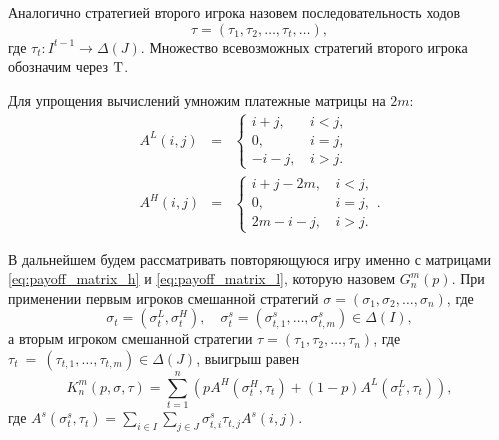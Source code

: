 Аналогично стратегией второго игрока назовем последовательность ходов
\[
  \tau = (\tau_1, \tau_2, \ldots, \tau_t, \ldots),
\]
где $ \tau_t: I^{t-1} \rightarrow \Delta(J) $. Множество всевозможных стратегий второго игрока обозначим через $ \mathrm{T} $.

Для упрощения вычислений умножим платежные матрицы на $ 2m $:
\begin{eqnarray}
\label{eq:payoff_matrix_h}
A^L(i, j) &=& \begin{cases}
  i + j, &\, i < j, \\
  0, &\, i = j, \\
  -i - j, &\, i > j.
\end{cases}
\\
\label{eq:payoff_matrix_l}
A^H(i, j) &=& \begin{cases}
  i + j - 2m, &\, i < j, \\
  0, &\, i = j, \\
  2m - i - j, &\, i > j.
\end{cases}.
\end{eqnarray}

В дальнейшем будем рассматривать повторяющуюся игру именно с матрицами \eqref{eq:payoff_matrix_h} и \eqref{eq:payoff_matrix_l}, которую назовем $ G_n^m(p) $. При применении первым игроков смешанной стратегий 
$ \sigma = (\sigma_1, \sigma_2, \ldots, \sigma_n) $, где 
\[ 
  \sigma_t = (\sigma_t^L, \sigma_t^H), \quad
  \sigma^s_t = (\sigma^s_{t, 1}, \ldots, \sigma^s_{t, m}) \in \Delta(I),
\] 
а вторым игроком смешанной стратегии 
$ \tau = (\tau_1, \tau_2, \ldots, \tau_n) $, где
$ \tau_t~=~(\tau_{t, 1}, \ldots, \tau_{t, m}) \in \Delta(J) $,
выигрыш равен
\begin{equation}
\label{eq:value_of_game_n}
K_n^m(p, \sigma, \tau) = \sum_{t=1}^n
    \left(
        pA^H(\sigma_t^H, \tau_t) + (1 - p)A^L(\sigma_t^L, \tau_t)
    \right),
\end{equation}
где 
$ 
  A^s(\sigma^s_t,\tau_t) = 
    \sum_{i \in I}
      \sum_{j \in J}
        \sigma^s_{t, i} \tau_{t, j} A^s(i, j).
$